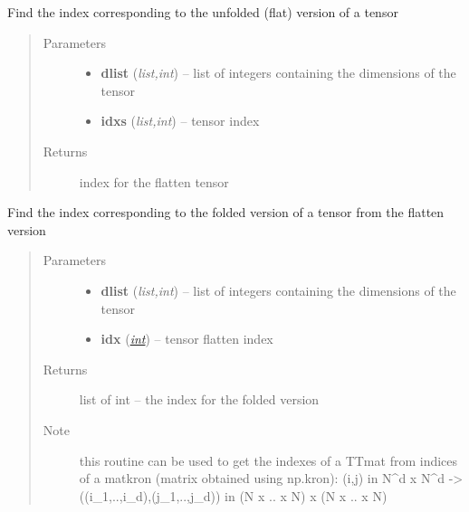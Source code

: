 \documentclass[a4paper,10pt,english]{sphinxmanual}
\begin{document}
\begin{fulllineitems}
\label{api-core:TensorToolbox.core.idxunfold}
Find the index corresponding to the unfolded (flat) version of a tensor
\begin{quote}\begin{description}
\item[{Parameters}] \leavevmode\begin{itemize}
\item {} 
\textbf{dlist} (\emph{list,int}) -- list of integers containing the dimensions of the tensor

\item {} 
\textbf{idxs} (\emph{list,int}) -- tensor index

\end{itemize}

\item[{Returns}] \leavevmode
index for the flatten tensor

\end{description}\end{quote}

\end{fulllineitems}


\begin{fulllineitems}
\label{api-core:TensorToolbox.core.idxfold}
Find the index corresponding to the folded version of a tensor from the flatten version
\begin{quote}\begin{description}
\item[{Parameters}] \leavevmode\begin{itemize}
\item {} 
\textbf{dlist} (\emph{list,int}) -- list of integers containing the dimensions of the tensor

\item {} 
\textbf{idx} (\href{http://docs.python.org/library/functions.html\#int}{\emph{int}}) -- tensor flatten index

\end{itemize}

\item[{Returns}] \leavevmode
list of int -- the index for the folded version

\item[{Note}] \leavevmode
this routine can be used to get the indexes of a TTmat from indices of a matkron (matrix obtained using np.kron): (i,j) in N\textasciicircum{}d x N\textasciicircum{}d -\textgreater{} ((i\_1,..,i\_d),(j\_1,..,j\_d)) in (N x .. x N) x (N x .. x N)

\end{description}\end{quote}

\end{fulllineitems}
\end{document}
